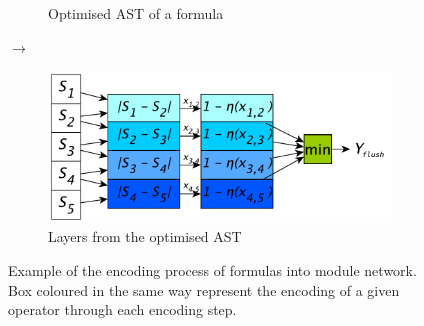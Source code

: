 \begin{figure}
\begin{subfigure}[]{0.32\linewidth}
        \caption{Optimised AST of a formula}
        \label{fig:ast-kins-optimised}
    \end{subfigure}
    \hfill$\rightarrow$\hfill
    \begin{subfigure}[]{0.35\linewidth}
        \centering
        \includegraphics[width=\linewidth]{figures/net-flush.pdf}
        \caption{Layers from the optimised AST}
        \label{fig:net-kins-encoded}
    \end{subfigure}
    \caption[KINS Encoding of logic formulas into module networks]{
        Example of the encoding process of formulas into module network.
        Box coloured in the same way represent the encoding of a given operator through each encoding step.
    }
    \label{fig:ast-kins}
\end{figure}
